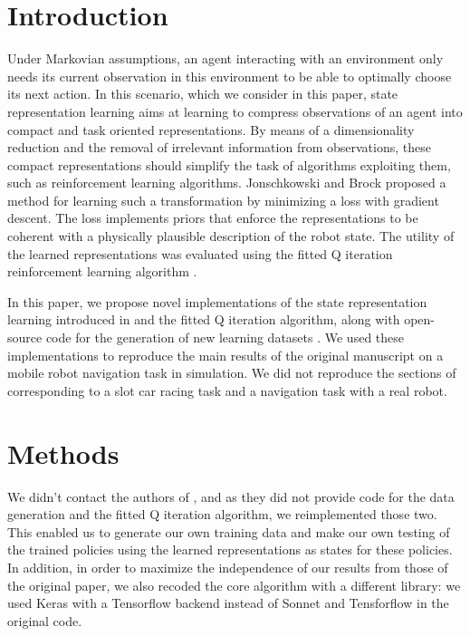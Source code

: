 \documentclass[10pt,a4paper,onecolumn]{article}
\begin{document}
\section*{Introduction}
Under Markovian assumptions, an agent interacting with an environment only needs its current observation in this environment to be able to optimally choose its next action. In this scenario, which we consider in this paper, state representation learning aims at learning to compress observations of an agent  into compact and task oriented representations.
 By means of a dimensionality reduction and the removal of irrelevant information from observations, these compact representations should simplify the task of algorithms exploiting them, such as reinforcement learning algorithms. Jonschkowski and Brock \cite{jonschkowski2015learning} proposed a method for learning such a transformation by minimizing a loss with gradient descent. The loss implements priors that enforce the representations to be coherent with a physically plausible description of the robot state. 
The utility of the learned representations was evaluated using the fitted Q iteration reinforcement learning algorithm \cite{ernst2005tree}.

In this paper, we propose novel implementations of the state representation learning introduced in \cite{jonschkowski2015learning} and the fitted Q iteration algorithm, along with open-source code for the generation of new learning datasets \cite{RoundBotRepo}\cite{RoundBotArchive}. We used these implementations to reproduce the main results of the original manuscript on a mobile robot navigation task in simulation. We did not reproduce the sections of \cite{jonschkowski2015learning} corresponding to a slot car racing task and a navigation task with a real robot.\\


\section*{Methods}

We didn't contact the authors of \cite{jonschkowski2015learning}, and as they did not provide code for the data generation and the fitted Q iteration algorithm, we reimplemented those two. This enabled us to generate our own training data and make our own testing of the trained policies using the learned representations as states for these policies.
In addition, in order to maximize the independence of our results from those of the original paper, we also recoded the core algorithm with a different library: we used Keras with a Tensorflow backend instead of Sonnet and Tensforflow in the original code.\\
\end{document}
